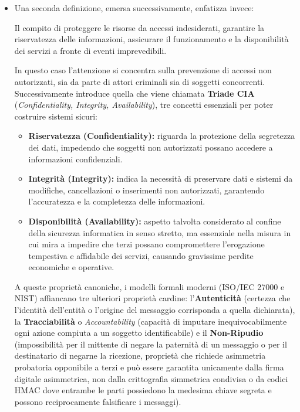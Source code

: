 \documentclass[../../main.tex]{subfiles}
\begin{document}
\begin{itemize}
    \item Una seconda definizione, emersa successivamente, enfatizza invece:
    \begin{definition}
    Il compito di proteggere le risorse da accessi indesiderati, garantire la riservatezza delle informazioni, assicurare il funzionamento e la disponibilità dei servizi a fronte di eventi imprevedibili.
    \end{definition}
    In questo caso l'attenzione si concentra sulla prevenzione di accessi non autorizzati, sia da parte di attori criminali sia di soggetti concorrenti. Successivamente introduce quella che viene chiamata \textbf{Triade CIA} (\textit{Confidentiality, Integrity, Availability}), tre concetti essenziali per poter costruire sistemi sicuri:
    \begin{itemize}
        \item \textbf{Riservatezza (Confidentiality):} riguarda la protezione della segretezza dei dati, impedendo che soggetti non autorizzati possano accedere a informazioni confidenziali.
        \item \textbf{Integrità (Integrity):} indica la necessità di preservare dati e sistemi da modifiche, cancellazioni o inserimenti non autorizzati, garantendo l'accuratezza e la completezza delle informazioni.
        \item \textbf{Disponibilità (Availability):} aspetto talvolta considerato al confine della sicurezza informatica in senso stretto, ma essenziale nella misura in cui mira a impedire che terzi possano compromettere l'erogazione tempestiva e affidabile dei servizi, causando gravissime perdite economiche e operative.
    \end{itemize}
    A queste proprietà canoniche, i modelli formali moderni (ISO/IEC 27000 e NIST) affiancano tre ulteriori proprietà cardine: l'\textbf{Autenticità} (certezza che l'identità dell'entità o l'origine del messaggio corrisponda a quella dichiarata), la \textbf{Tracciabilità} o \textit{Accountability} (capacità di imputare inequivocabilmente ogni azione compiuta a un soggetto identificabile) e il \textbf{Non-Ripudio} (impossibilità per il mittente di negare la paternità di un messaggio o per il destinatario di negarne la ricezione, proprietà che richiede asimmetria probatoria opponibile a terzi e può essere garantita unicamente dalla firma digitale asimmetrica, non dalla crittografia simmetrica condivisa o da codici HMAC dove entrambe le parti possiedono la medesima chiave segreta e possono reciprocamente falsificare i messaggi).


\end{itemize}
\end{document}
